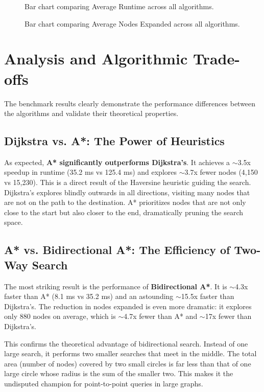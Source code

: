 \documentclass[12pt, a4paper]{report}
\begin{document}
\begin{figure}[h!]
    \centering
    \fbox{\rule{0pt}{3in}\rule{0.9\linewidth}{0pt}}
    \caption{Bar chart comparing Average Runtime across all algorithms.}
    \label{fig:runtime_chart}
\end{figure}

\begin{figure}[h!]
    \centering
    \fbox{\rule{0pt}{3in}\rule{0.9\linewidth}{0pt}}
    \caption{Bar chart comparing Average Nodes Expanded across all algorithms.}
    \label{fig:nodes_chart}
\end{figure}

\section{Analysis and Algorithmic Trade-offs}
The benchmark results clearly demonstrate the performance differences between the algorithms and validate their theoretical properties.

\subsection{Dijkstra vs. A*: The Power of Heuristics}
As expected, \textbf{A* significantly outperforms Dijkstra's}. It achieves a $\sim$3.5x speedup in runtime (35.2 ms vs 125.4 ms) and explores $\sim$3.7x fewer nodes (4,150 vs 15,230). This is a direct result of the Haversine heuristic guiding the search. Dijkstra's explores blindly outwards in all directions, visiting many nodes that are not on the path to the destination. A* prioritizes nodes that are not only close to the start but also closer to the end, dramatically pruning the search space.

\subsection{A* vs. Bidirectional A*: The Efficiency of Two-Way Search}
The most striking result is the performance of \textbf{Bidirectional A*}. It is $\sim$4.3x faster than A* (8.1 ms vs 35.2 ms) and an astounding $\sim$15.5x faster than Dijkstra's. The reduction in nodes expanded is even more dramatic: it explores only 880 nodes on average, which is $\sim$4.7x fewer than A* and $\sim$17x fewer than Dijkstra's.

This confirms the theoretical advantage of bidirectional search. Instead of one large search, it performs two smaller searches that meet in the middle. The total area (number of nodes) covered by two small circles is far less than that of one large circle whose radius is the sum of the smaller two. This makes it the undisputed champion for point-to-point queries in large graphs.
\end{document}
